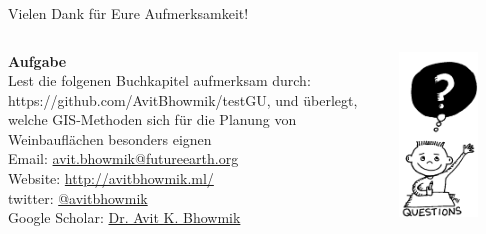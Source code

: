 \documentclass{beamer}
\begin{document}
\begin{frame}
\frametitle{}
\centering
\LARGE Vielen Dank für Eure Aufmerksamkeit!\\
\normalsize
\begin{columns}
\begin{column}{0.6\textwidth}
\alert{\textbf{Aufgabe}}\\
Lest die folgenen Buchkapitel aufmerksam durch: \alert{https://github.com/AvitBhowmik/testGU}, und überlegt, welche GIS-Methoden sich für die Planung von Weinbauflächen besonders eignen\\[1cm]
\footnotesize
   Email: \href{mailto:avit.bhowmik@futureearth.org}{\alert{avit.bhowmik@futureearth.org}}\\
   Website: \href{http://avitbhowmik.ml/}{\alert{http://avitbhowmik.ml/}}\\
twitter: \href{https://twitter.com/avitbhowmik}{\alert{@avitbhowmik}}\\
   Google Scholar: \href{https://scholar.google.se/citations?user=laRo5pgAAAAJ&hl=en}{\alert{Dr. Avit K. Bhowmik}}
\end{column}
\begin{column}{0.4\textwidth}
    \begin{center}
     \includegraphics[width=0.7\textwidth]{Figures/Ques.png}
     \end{center}
\end{column}
\end{columns}
\end{frame}

\end{document}
